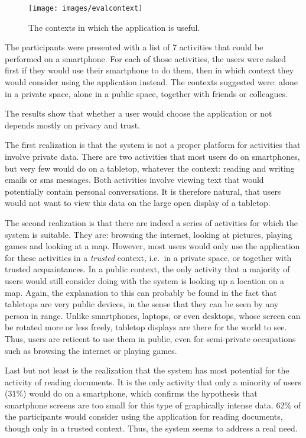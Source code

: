 \begin{figure}[htb]
  \centering
    \texttt{[image: images/evalcontext]}
    \caption{The contexts in which the application is useful.}
    \label{fig:evalcontext}
\end{figure}

The participants were presented with a list of 7 activities that could be performed on a smartphone.
For each of those activities, the users were asked first if they would use their smartphone to do them, then in which context they would consider using the application instead.
The contexts suggested were: alone in a private space, alone in a public space, together with friends or colleagues.

The results show that whether a user would choose the application or not depends mostly on privacy and trust.

The first realization is that the system is not a proper platform for activities that involve private data.
There are two activities that most users do on smartphones, but very few would do on a tabletop, whatever the context: reading and writing emails or sms messages.
Both activities involve viewing text that would potentially contain personal conversations.
It is therefore natural, that users would not want to view this data on the large open display of a tabletop.

The second realization is that there are indeed a series of activities for which the system is suitable.
They are: browsing the internet, looking at pictures, playing games and looking at a map.
However, most users would only use the application for these activities in a \emph{trusted} context, i.e.\ in a private space, or together with trusted acquaintances.
In a public context, the only activity that a majority of users would still consider doing with the system is looking up a location on a map.
Again, the explanation to this can probably be found in the fact that tabletops are very public devices, in the sense that they can be seen by any person in range.
Unlike smartphones, laptops, or even desktops, whose screen can be rotated more or less freely, tabletop displays are there for the world to see.
Thus, users are reticent to use them in public, even for semi-private occupations such as browsing the internet or playing games.

Last but not least is the realization that the system has most potential for the activity of reading documents.
It is the only activity that only a minority of users (31\%) would do on a smartphone, which confirms the hypothesis that smartphone screens are too small for this type of graphically intense data.
62\% of the participants would consider using the application for reading documents, though only in a trusted context.
Thus, the system seems to address a real need.


















